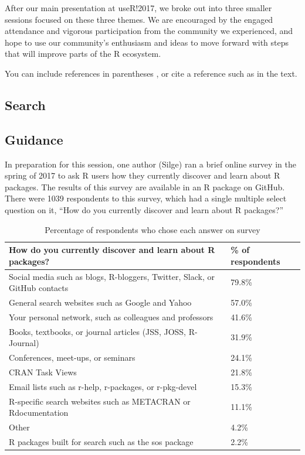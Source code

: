 After our main presentation at useR!2017, we broke out into three
smaller sessions focused on these three themes. We are encouraged by the
engaged attendance and vigorous participation from the community we
experienced, and hope to use our community's enthusiasm and ideas to
move forward with steps that will improve parts of the R ecosystem.

You can include references in parentheses \citep{R}, or cite a reference
such as \citet{R} in the text.

\subsection{Search}\label{search}

\subsection{Guidance}\label{guidance}

In preparation for this session, one author (Silge) ran a brief online
survey in the spring of 2017 to ask R users how they currently discover
and learn about R packages. The results of this survey are available in
an R package \citep{packagesurvey} on GitHub. There were 1039
respondents to this survey, which had a single multiple select question
on it, ``How do you currently discover and learn about R packages?''

\begin{Schunk}
\begin{table}

\caption{\label{tab:unnamed-chunk-2}Percentage of respondents who chose each answer on survey}
\centering
\begin{tabular}[t]{ll}
\toprule
How do you currently discover and learn about R packages? & \% of respondents\\
\midrule
Social media such as blogs, R-bloggers, Twitter, Slack, or GitHub contacts & 79.8\%\\
General search websites such as Google and Yahoo & 57.0\%\\
Your personal network, such as colleagues and professors & 41.6\%\\
Books, textbooks, or journal articles (JSS, JOSS, R-Journal) & 31.9\%\\
Conferences, meet-ups, or seminars & 24.1\%\\
\addlinespace
CRAN Task Views & 21.8\%\\
Email lists such as r-help, r-packages, or r-pkg-devel & 15.3\%\\
R-specific search websites such as METACRAN or Rdocumentation & 11.1\%\\
Other & 4.2\%\\
R packages built for search such as the sos package & 2.2\%\\
\bottomrule
\end{tabular}
\end{table}

\end{Schunk}

